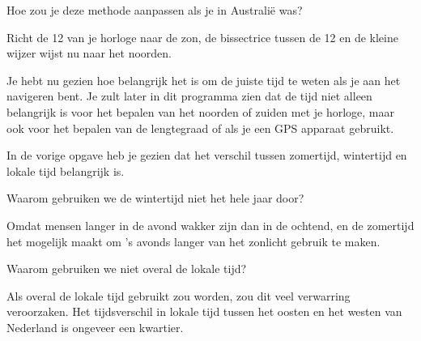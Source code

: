 \begin{opgave}
    Hoe zou je deze methode aanpassen als je in Australi\"{e} was?
    \begin{antwoord}
        Richt de 12 van je horloge naar de zon, de bissectrice tussen de 12 en de kleine wijzer wijst nu naar het noorden.
    \end{antwoord}
\end{opgave}

Je hebt nu gezien hoe belangrijk het is om de juiste tijd te weten als je aan het navigeren bent. Je zult later in dit programma zien dat de tijd niet alleen belangrijk is voor het bepalen van het noorden of zuiden met je horloge, maar ook voor het bepalen van de lengtegraad of als je een GPS apparaat gebruikt.

\begin{opgave}
 In de vorige opgave heb je gezien dat het verschil tussen zomertijd, wintertijd en lokale tijd belangrijk is.
 \begin{subopgave}
  Waarom gebruiken we de wintertijd niet het hele jaar door?
  \begin{antwoord}
   Omdat mensen langer in de avond wakker zijn dan in de ochtend, en de zomertijd het mogelijk maakt om 's avonds langer van het zonlicht gebruik te maken.
  \end{antwoord}
 \end{subopgave}
 \begin{subopgave}
  Waarom gebruiken we niet overal de lokale tijd?
  \begin{antwoord}
   Als overal de lokale tijd gebruikt zou worden, zou dit veel verwarring veroorzaken. Het tijdsverschil in lokale tijd tussen het oosten en het westen van Nederland is ongeveer een kwartier.
  \end{antwoord}
 \end{subopgave}


\end{opgave}
